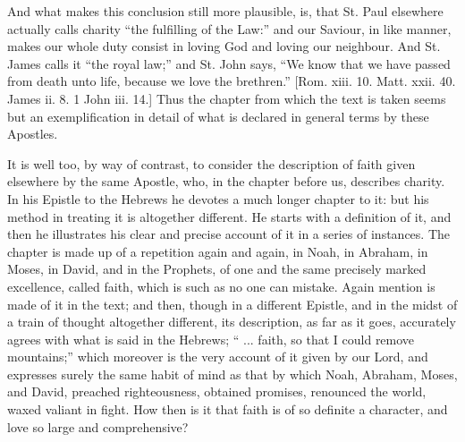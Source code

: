 And what makes this conclusion still more plausible, is, that St.
Paul elsewhere actually calls charity ``the fulfilling of the
Law:'' and our Saviour, in like manner, makes our whole duty
consist in loving God and loving our neighbour. And St. James calls it
``the royal law;'' and St. John says, ``We know that we
have passed from death unto life, because we love the brethren.''
[Rom. xiii. 10. Matt. xxii. 40. James ii. 8. 1 John iii. 14.] Thus the
chapter from which the text is taken seems but an exemplification in
detail of what is declared in general terms by these Apostles.

It is well too, by way of contrast, to consider the description of
faith given elsewhere by the same Apostle, who, in the chapter before
us, describes charity. In his Epistle to the Hebrews he devotes a much
longer chapter to it: but his method in treating it is altogether
different. He starts with a definition of it, and then he illustrates
his clear and precise account of it in a series of instances. The
chapter is made up of a repetition again and again, in Noah, in
Abraham, in Moses, in David, and in the Prophets, of one and the same
precisely marked excellence, called faith, which is such as no one can
mistake. Again mention is made of it in the text; and then, though in
a different Epistle, and in the midst of a train of thought altogether
different, its description, as far as it goes, accurately agrees with
what is said in the Hebrews; `` ... faith, so that I could remove
mountains;'' which moreover is the very account of it given by our
Lord, and expresses surely the same habit of mind as that by which
Noah, Abraham, Moses, and David, preached righteousness, obtained
promises, renounced the world, waxed valiant in fight. How then is it
that faith is of so definite a character, and love so large and
comprehensive?

